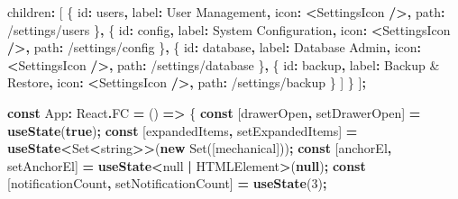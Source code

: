 \documentclass[
]{article}
\newenvironment{Shaded}{\begin{snugshade}}{\end{snugshade}}
\newcommand{\AttributeTok}[1]{\textcolor[rgb]{0.13,0.29,0.53}{#1}}
\newcommand{\BuiltInTok}[1]{#1}
\newcommand{\DataTypeTok}[1]{\textcolor[rgb]{0.13,0.29,0.53}{#1}}
\newcommand{\DecValTok}[1]{\textcolor[rgb]{0.00,0.00,0.81}{#1}}
\newcommand{\FunctionTok}[1]{\textcolor[rgb]{0.13,0.29,0.53}{\textbf{#1}}}
\newcommand{\KeywordTok}[1]{\textcolor[rgb]{0.13,0.29,0.53}{\textbf{#1}}}
\newcommand{\NormalTok}[1]{#1}
\newcommand{\OperatorTok}[1]{\textcolor[rgb]{0.81,0.36,0.00}{\textbf{#1}}}
\newcommand{\StringTok}[1]{\textcolor[rgb]{0.31,0.60,0.02}{#1}}
\begin{document}
\begin{Shaded}
\begin{Highlighting}[]
\NormalTok{    children}\OperatorTok{:}\NormalTok{ [}
\NormalTok{      \{ id}\OperatorTok{:} \StringTok{\textquotesingle{}users\textquotesingle{}}\OperatorTok{,}\NormalTok{ label}\OperatorTok{:} \StringTok{\textquotesingle{}User Management\textquotesingle{}}\OperatorTok{,}\NormalTok{ icon}\OperatorTok{:} \OperatorTok{\textless{}}\NormalTok{SettingsIcon }\OperatorTok{/\textgreater{},}\NormalTok{ path}\OperatorTok{:} \StringTok{\textquotesingle{}/settings/users\textquotesingle{}}\NormalTok{ \}}\OperatorTok{,}
\NormalTok{      \{ id}\OperatorTok{:} \StringTok{\textquotesingle{}config\textquotesingle{}}\OperatorTok{,}\NormalTok{ label}\OperatorTok{:} \StringTok{\textquotesingle{}System Configuration\textquotesingle{}}\OperatorTok{,}\NormalTok{ icon}\OperatorTok{:} \OperatorTok{\textless{}}\NormalTok{SettingsIcon }\OperatorTok{/\textgreater{},}\NormalTok{ path}\OperatorTok{:} \StringTok{\textquotesingle{}/settings/config\textquotesingle{}}\NormalTok{ \}}\OperatorTok{,}
\NormalTok{      \{ id}\OperatorTok{:} \StringTok{\textquotesingle{}database\textquotesingle{}}\OperatorTok{,}\NormalTok{ label}\OperatorTok{:} \StringTok{\textquotesingle{}Database Admin\textquotesingle{}}\OperatorTok{,}\NormalTok{ icon}\OperatorTok{:} \OperatorTok{\textless{}}\NormalTok{SettingsIcon }\OperatorTok{/\textgreater{},}\NormalTok{ path}\OperatorTok{:} \StringTok{\textquotesingle{}/settings/database\textquotesingle{}}\NormalTok{ \}}\OperatorTok{,}
\NormalTok{      \{ id}\OperatorTok{:} \StringTok{\textquotesingle{}backup\textquotesingle{}}\OperatorTok{,}\NormalTok{ label}\OperatorTok{:} \StringTok{\textquotesingle{}Backup \& Restore\textquotesingle{}}\OperatorTok{,}\NormalTok{ icon}\OperatorTok{:} \OperatorTok{\textless{}}\NormalTok{SettingsIcon }\OperatorTok{/\textgreater{},}\NormalTok{ path}\OperatorTok{:} \StringTok{\textquotesingle{}/settings/backup\textquotesingle{}}\NormalTok{ \}}
\NormalTok{    ]}
\NormalTok{  \}}
\NormalTok{]}\OperatorTok{;}

\KeywordTok{const}\NormalTok{ App}\OperatorTok{:}\NormalTok{ React}\OperatorTok{.}\AttributeTok{FC} \OperatorTok{=}\NormalTok{ () }\KeywordTok{=\textgreater{}}\NormalTok{ \{}
  \KeywordTok{const}\NormalTok{ [drawerOpen}\OperatorTok{,}\NormalTok{ setDrawerOpen] }\OperatorTok{=} \FunctionTok{useState}\NormalTok{(}\KeywordTok{true}\NormalTok{)}\OperatorTok{;}
  \KeywordTok{const}\NormalTok{ [expandedItems}\OperatorTok{,}\NormalTok{ setExpandedItems] }\OperatorTok{=} \FunctionTok{useState}\OperatorTok{\textless{}}\BuiltInTok{Set}\OperatorTok{\textless{}}\DataTypeTok{string}\OperatorTok{\textgreater{}\textgreater{}}\NormalTok{(}\KeywordTok{new} \BuiltInTok{Set}\NormalTok{([}\StringTok{\textquotesingle{}mechanical\textquotesingle{}}\NormalTok{]))}\OperatorTok{;}
  \KeywordTok{const}\NormalTok{ [anchorEl}\OperatorTok{,}\NormalTok{ setAnchorEl] }\OperatorTok{=} \FunctionTok{useState}\OperatorTok{\textless{}}\DataTypeTok{null} \OperatorTok{|} \BuiltInTok{HTMLElement}\OperatorTok{\textgreater{}}\NormalTok{(}\KeywordTok{null}\NormalTok{)}\OperatorTok{;}
  \KeywordTok{const}\NormalTok{ [notificationCount}\OperatorTok{,}\NormalTok{ setNotificationCount] }\OperatorTok{=} \FunctionTok{useState}\NormalTok{(}\DecValTok{3}\NormalTok{)}\OperatorTok{;}


\end{Highlighting}
\end{Shaded}
\end{document}
